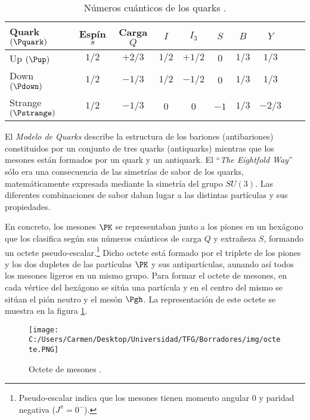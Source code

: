 \begin{table}[h!]
	\centering
	\begin{tabular}{l*{8}{c}r}
\hline
Quark $(\Pquark)$ & Espín $s$ & Carga $Q$ & $I$ & $I_3$ & $S$ & $B$ & $Y$\\ 
\hline
Up $(\Pup)$ & $1/2$ & $+2/3$ & $1/2$ & $+1/2$ & $0$ & $1/3$ & $1/3$\\
Down $(\Pdown)$ & $1/2$ & $-1/3$ & $1/2$ & $-1/2$ & $0$ & $1/3$ & $1/3$\\
Strange $(\Pstrange)$ & $1/2$ & $-1/3$ & $0$ & $0$ & $-1$ & $1/3$ & $-2/3$\\
\hline
	\end{tabular}
\caption[Números cuánticos de los quarks]{Números cuánticos de los quarks \cite{notas2020}.} %
\label{tab:propiedades_quarks}
\end{table}


El \textit{Modelo de Quarks} describe la estructura de los bariones (antibariones) constituidos por un conjunto de tres quarks (antiquarks) mientras que los mesones están formados por un quark y un antiquark. El ``\textit{The Eightfold Way}'' sólo era una consecuencia de las simetrías de sabor de los quarks, matemáticamente expresada mediante la simetría del grupo $SU(3)$. Las diferentes combinaciones de sabor daban lugar a las distintas partículas y sus propiedades.

En concreto, los mesones $\PK$ se representaban junto a los piones en un hexágono que los clasifica según sus números cuánticos de carga $Q$ y extrañeza $S$, formando un octete pseudo-escalar.\footnote{Pseudo-escalar indica que los mesones tienen momento angular 0 y paridad negativa ($J^\pi = 0^-$).} Dicho octete está formado por el triplete de los piones y los dos dupletes de las partículas $\PK$ y sus antipartículas, aunando así todos los mesones ligeros en un mismo grupo. Para formar el octete de mesones, en cada vértice del hexágono se sitúa una partícula y en el centro del mismo se sitúan el pión neutro y el mesón $\Pgh$. La representación de este octete se muestra en la figura \ref{fig:octete}.

\begin{figure}[h!]
	\centering
	\texttt{[image: C:/Users/Carmen/Desktop/Universidad/TFG/Borradores/img/octete.PNG]}
	\caption[Octete de mesones]
	{Octete de mesones \cite{Griffiths2008}.}
	\label{fig:octete}
\end{figure}

